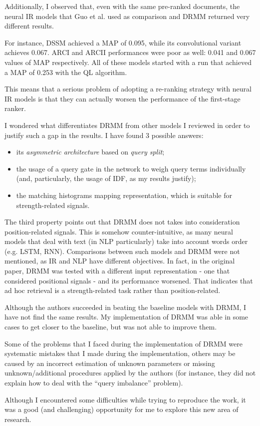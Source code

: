 Additionally, I observed that, even with the same pre-ranked documents, the neural IR models that Guo et al. used as comparison and DRMM returned very different results.

For instance, DSSM achieved a MAP of 0.095, while its convolutional variant achieves 0.067. ARCI and ARCII performances were poor as well: 0.041 and 0.067 values of MAP respectively. All of these models started with a run that achieved a MAP of 0.253 with the QL algorithm.

This means that a serious problem of adopting a re-ranking strategy with neural IR models is that they can actually worsen the performance of the first-stage ranker.

I wondered what differentiates DRMM from other models I reviewed in order to justify such a gap in the results. I have found 3 possible answers:

\begin{itemize}
    \item its \textit{asymmetric architecture} based on \textit{query split};
    \item the usage of a query gate in the network to weigh query terms individually (and, particularly, the usage of IDF, as my results justify);
    \item the matching histograms mapping representation, which is suitable for strength-related signals.
\end{itemize}

The third property points out that DRMM does not takes into consideration position-related signals. This is somehow counter-intuitive, as many neural models that deal with text (in NLP particularly) take into account words order (e.g. LSTM, RNN). Comparisons between such models and DRMM were not mentioned, as IR and NLP have different objectives. In fact, in the original paper, DRMM was tested with a different input representation - one that considered positional signals - and its performance worsened. That indicates that ad hoc retrieval is a strength-related task rather than position-related.

Although the authors succeeded in beating the baseline models with DRMM, I have not find the same results. My implementation of DRMM was able in some cases to get closer to the baseline, but was not able to improve them.

Some of the problems that I faced during the implementation of DRMM were systematic mistakes that I made during the implementation, others may be caused by an incorrect estimation of unknown parameters or missing unknown/additional procedures applied by the authors (for instance, they did not explain how to deal with the ``query imbalance'' problem).

Although I encountered some difficulties while trying to reproduce the work, it was a good (and challenging) opportunity for me to explore this new area of research.
